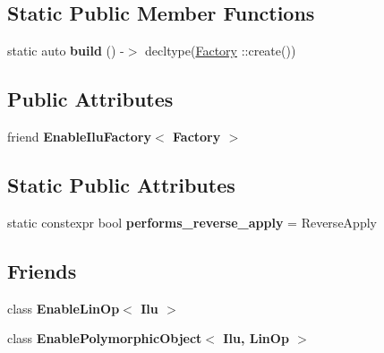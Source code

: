 \subsection*{Static Public Member Functions}
\begin{DoxyCompactItemize}
\item 
\mbox{\label{classgko_1_1preconditioner_1_1Ilu_a555ab732d2617fe5cf2b495b326c0bde}} 
static auto {\bfseries build} () -\/$>$ decltype(\hyperlink{classgko_1_1preconditioner_1_1Ilu_1_1Factory}{Factory} \+::create())
\end{DoxyCompactItemize}
\subsection*{Public Attributes}
\begin{DoxyCompactItemize}
\item 
\mbox{\label{classgko_1_1preconditioner_1_1Ilu_a24ad44946aa02a3843fea4297d255b1d}} 
friend {\bfseries Enable\+Ilu\+Factory$<$ Factory $>$}
\end{DoxyCompactItemize}
\subsection*{Static Public Attributes}
\begin{DoxyCompactItemize}
\item 
\mbox{\label{classgko_1_1preconditioner_1_1Ilu_ad8f5de9048f4d1f7f8dd4514582425a8}} 
static constexpr bool {\bfseries performs\+\_\+reverse\+\_\+apply} = Reverse\+Apply
\end{DoxyCompactItemize}
\subsection*{Friends}
\begin{DoxyCompactItemize}
\item 
\mbox{\label{classgko_1_1preconditioner_1_1Ilu_adb36e2f28014180f7ce53ccfa5b6a08f}} 
class {\bfseries Enable\+Lin\+Op$<$ Ilu $>$}
\item 
\mbox{\label{classgko_1_1preconditioner_1_1Ilu_a211c0b867df6d3bef3c8f5589c499bc9}} 
class {\bfseries Enable\+Polymorphic\+Object$<$ Ilu, Lin\+Op $>$}
\end{DoxyCompactItemize}


